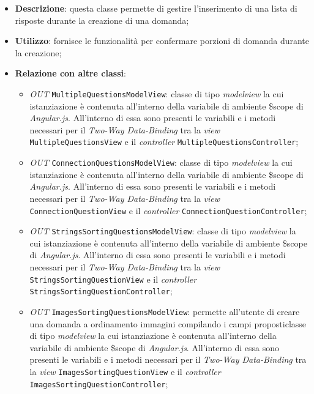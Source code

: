 \begin{itemize}
	\item \textbf{Descrizione}: questa classe permette di gestire l'inserimento di una lista di risposte durante la creazione di una domanda;
	\item \textbf{Utilizzo}: fornisce le funzionalità per confermare porzioni di domanda durante la creazione;
	\item \textbf{Relazione con altre classi}:
	\begin{itemize}
		\item \textit{OUT} \texttt{MultipleQuestionsModelView}: classe di tipo \textit{modelview} la cui istanziazione è contenuta all'interno della variabile di ambiente \$scope di \textit{Angular.js}. All'interno di essa sono presenti le variabili e i metodi necessari per il \textit{Two-Way Data-Binding} tra la \textit{view} \texttt{MultipleQuestionsView} e il \textit{controller} \texttt{MultipleQuestionsController};
		\item \textit{OUT} \texttt{ConnectionQuestionsModelView}: classe di tipo \textit{modelview} la cui istanziazione è contenuta all'interno della variabile di ambiente \$scope di \textit{Angular.js}. All'interno di essa sono presenti le variabili e i metodi necessari per il \textit{Two-Way Data-Binding} tra la \textit{view} \texttt{ConnectionQuestionView} e il \textit{controller} \texttt{ConnectionQuestionController};
		\item \textit{OUT} \texttt{StringsSortingQuestionsModelView}: classe di tipo \textit{modelview} la cui istanziazione è contenuta all'interno della variabile di ambiente \$scope di \textit{Angular.js}. All'interno di essa sono presenti le variabili e i metodi necessari per il \textit{Two-Way Data-Binding} tra la \textit{view} \texttt{StringsSortingQuestionView} e il \textit{controller} \\ \texttt{StringsSortingQuestionController}; 
		\item \textit{OUT} \texttt{ImagesSortingQuestionsModelView}: permette all'utente di creare una domanda a ordinamento immagini compilando i campi proposticlasse di tipo \textit{modelview} la cui istanziazione è contenuta all'interno della variabile di ambiente \$scope di \textit{Angular.js}. All'interno di essa sono presenti le variabili e i metodi necessari per il \textit{Two-Way Data-Binding} tra la \textit{view} \texttt{ImagesSortingQuestionView} e il \textit{controller} \\ \texttt{ImagesSortingQuestionController};

\end{itemize}
\end{itemize}
